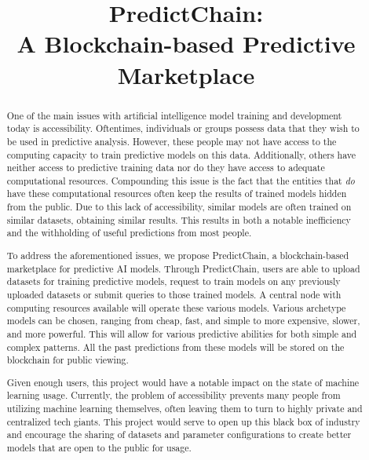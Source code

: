 \documentclass{ledger}
\title{PredictChain:\\
A Blockchain-based Predictive Marketplace}
\begin{document}
\maketitle

\thispagestyle{pagefirst}

\begin{abstract}
One of the main issues with artificial intelligence model training and development today is accessibility. Oftentimes,
individuals or groups possess data that they wish to be used in predictive analysis. However, these people may not have
access to the computing capacity to train predictive models on this data.  Additionally, others have neither access to
predictive training data nor do they have access to adequate computational resources. Compounding this issue is the fact
that the entities that \textit{do} have these computational resources often keep the results of trained models hidden
from the public.  Due to this lack of accessibility, similar models are often trained on similar datasets, obtaining
similar results.  This results in both a notable inefficiency and the withholding of useful predictions from most people.

To address the aforementioned issues, we propose PredictChain, a blockchain-based marketplace for predictive AI models.
Through PredictChain, users are able to upload datasets for training predictive models, request to train models on any
previously uploaded datasets or submit queries to those trained models.  A central node with computing resources available
will operate these various models. Various archetype models can be chosen, ranging from cheap, fast, and simple to more
expensive, slower, and more powerful.  This will allow for various predictive abilities for both simple and complex patterns.  All the past predictions from these models will be stored on the blockchain for public viewing.

Given enough users, this project would have a notable impact on the state of machine learning usage.  Currently, the
problem of accessibility prevents many people from utilizing machine learning themselves, often leaving them to turn
to highly private and centralized tech giants.  This project would serve to open up this black box of industry and
encourage the sharing of datasets and parameter configurations to create better models that are open to the public for usage.



\end{abstract}
\end{document}
